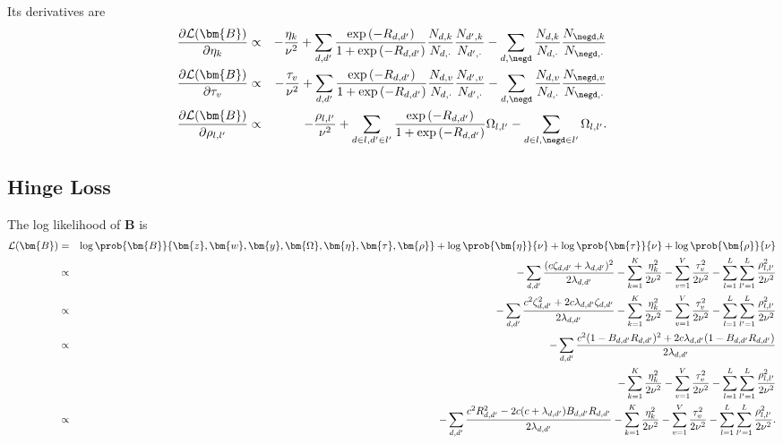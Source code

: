Its derivatives are
\begin{eqnarray}
\frac {\partial \mathcal{L}(\bm{B})} {\partial \eta_k} &\propto& - \frac {\eta_k} {\nu^2} + \sum_{d,d'} \frac {\exp \left( -R_{d,d'} \right)} {1 + \exp \left( -R_{d,d'} \right)} \frac {N_{d,k}} {N_{d,\cdot}} \frac {N_{d',k}} {N_{d',\cdot}} - \sum_{d,\negd} \frac {N_{d,k}} {N_{d,\cdot}} \frac {N_{\negd,k}} {N_{\negd,\cdot}} \label{eq:sigmoid_eta}\\
\frac {\partial \mathcal{L}(\bm{B})} {\partial \tau_v} &\propto& - \frac {\tau_v} {\nu^2} + \sum_{d,d'} \frac {\exp \left( -R_{d,d'} \right)} {1 + \exp \left( -R_{d,d'} \right)} \frac {N_{d,v}} {N_{d,\cdot}} \frac {N_{d',v}} {N_{d',\cdot}} - \sum_{d,\negd} \frac {N_{d,v}} {N_{d,\cdot}} \frac {N_{\negd,v}} {N_{\negd,\cdot}} \label{eq:sigmoid_tau}\\
\frac {\partial \mathcal{L}(\bm{B})} {\partial \rho_{l,l'}} &\propto& - \frac {\rho_{l,l'}} {\nu^2} + \sum_{d\in l,d'\in l'} \frac {\exp \left( -R_{d,d'} \right)} {1 + \exp \left( -R_{d,d'} \right)} \Omega_{l,l'} - \sum_{d\in l, \negd \in l'} \Omega_{l,l'}. \label{eq:sigmoid_rho}
\end{eqnarray}

\subsection{Hinge Loss}
\label{subsec:hinge_opt}

The log likelihood of $\bm{B}$ is
\begin{eqnarray}
\mathcal{L}(\bm{B}) &=& \log \prob {\bm{B}} {\bm{z}, \bm{w}, \bm{y}, \bm{\Omega}, \bm{\eta}, \bm{\tau}, \bm{\rho}} + \log \prob {\bm{\eta}} {\nu} + \log \prob {\bm{\tau}} {\nu} +\log \prob {\bm{\rho}}{\nu}\\
&\propto& -\sum_{d,d'} \frac {(c\zeta_{d,d'} + \lambda_{d,d'})^2} {2\lambda_{d,d'}} - \sum_{k=1}^{K} \frac {\eta_k^2} {2\nu^2} - \sum_{v=1}^{V} \frac {\tau_v^2} {2\nu^2} - \sum_{l=1}^{L} \sum_{l'=1}^{L} \frac {\rho_{l,l'}^2} {2\nu^2}\\
&\propto& -\sum_{d,d'} \frac {c^2 \zeta_{d,d'}^2 + 2c\lambda_{d,d'} \zeta_{d,d'}} {2\lambda_{d,d'}} - \sum_{k=1}^{K} \frac {\eta_k^2} {2\nu^2} - \sum_{v=1}^{V} \frac {\tau_v^2} {2\nu^2} - \sum_{l=1}^{L} \sum_{l'=1}^{L} \frac {\rho_{l,l'}^2} {2\nu^2}\\
&\propto& -\sum_{d,d'} \frac {c^2 (1 - B_{d,d'} R_{d,d'})^2 + 2c\lambda_{d,d'} (1 - B_{d,d'} R_{d,d'})} {2\lambda_{d,d'}} \notag\\
&&- \sum_{k=1}^{K} \frac {\eta_k^2} {2\nu^2} - \sum_{v=1}^{V} \frac {\tau_v^2} {2\nu^2} - \sum_{l=1}^{L} \sum_{l'=1}^{L} \frac {\rho_{l,l'}^2} {2\nu^2}\\
&\propto& -\sum_{d,d'} \frac {c^2 R_{d,d'}^2 - 2c (c+\lambda_{d,d'}) B_{d,d'} R_{d,d'}} {2\lambda_{d,d'}} - \sum_{k=1}^{K} \frac {\eta_k^2} {2\nu^2} - \sum_{v=1}^{V} \frac {\tau_v^2} {2\nu^2} - \sum_{l=1}^{L} \sum_{l'=1}^{L} \frac {\rho_{l,l'}^2} {2\nu^2}. \label{eq:hinge_likelihood}
\end{eqnarray}


